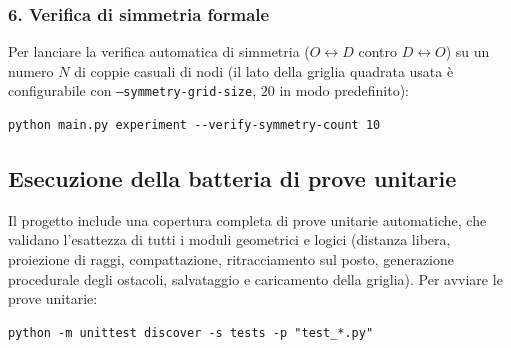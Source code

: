 \subsubsection{6. Verifica di simmetria formale}
Per lanciare la verifica automatica di simmetria ($O \leftrightarrow D$ contro $D \leftrightarrow O$) su un numero $N$ di coppie casuali di nodi (il lato della griglia quadrata usata è configurabile con \texttt{--symmetry-grid-size}, $20$ in modo predefinito):
\begin{lstlisting}[style=comandoshell]
python main.py experiment --verify-symmetry-count 10
\end{lstlisting}

\subsection{Esecuzione della batteria di prove unitarie}

Il progetto include una copertura completa di prove unitarie automatiche, che validano l'esattezza di tutti i moduli geometrici e logici (distanza libera, proiezione di raggi, compattazione, ritracciamento sul posto, generazione procedurale degli ostacoli, salvataggio e caricamento della griglia). Per avviare le prove unitarie:
\begin{lstlisting}[style=comandoshell]
python -m unittest discover -s tests -p "test_*.py"
\end{lstlisting}
